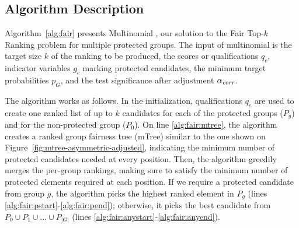 \begin{algorithm}[h]
{{			\label{alg:fair:pend}
		}
		\label{alg:fair:anyend}

	}
	\Return{$\tau$}
\end{algorithm}

\subsection{Algorithm Description}\label{subsec:algorithm-description}

Algorithm~\ref{alg:fair} presents Multinomial \algoFAIR, our solution to the {\sc Fair Top-$k$ Ranking} problem for multiple protected groups.
%
The input of multinomial \algoFAIR is
the target size $k$ of the ranking to be produced,
the scores or qualifications $q_c$,
indicator variables $g_c$ marking protected candidates,
the minimum target probabilities $p_G$, and
the test significance after adjustment $\alpha_\textit{corr}$.
%

The algorithm works as follows.
%
In the initialization, qualifications $q_c$ are used to create one ranked list of up to $k$ candidates for each of the protected groups ($P_g$) and for the non-protected group ($P_0$).
%
On line \ref{alg:fair:mtree}, the algorithm creates a ranked group fairness tree (mTree) similar to the one shown on Figure~\ref{fig:mtree-asymmetric-adjusted}, indicating the minimum number of protected candidates needed at every position. %
%
Then, the algorithm greedily merges the per-group rankings, making sure to satisfy the minimum number of protected elements required at each position.
%
If we require a protected candidate from group $g$, the algorithm picks the highest ranked element in $P_g$ (lines \ref{alg:fair:pstart}-\ref{alg:fair:pend}); otherwise, it picks the best candidate from $P_0 \cup P_1 \cup \ldots \cup P_{|G|}$ (lines \ref{alg:fair:anystart}-\ref{alg:fair:anyend}).
%

